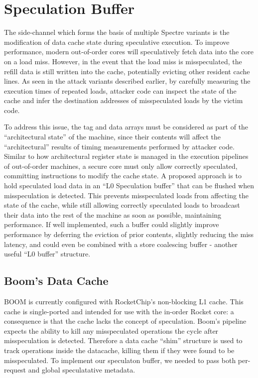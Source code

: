 \section{Speculation Buffer} \label{Speculation Buffer}

The side-channel which forms the basis of multiple Spectre variants is the modification of data cache state during speculative execution.
To improve performance, modern out-of-order cores will speculatively fetch data into the core on a load miss.
However, in the event that the load miss is misspeculated, the refill data is still written into the cache, potentially evicting other resident cache lines.
As seen in the attack variants described earlier, by carefully measuring the execution times of repeated loads, attacker code can inspect the state of the cache and infer the destination addresses of misspeculated loads by the victim code.

To address this issue, the tag and data arrays must be considered as part of the ``architectural state'' of the machine, since their contents will affect the ``architectural'' results of timing measurements performed by attacker code.
Similar to how architectural register state is managed in the execution pipelines of out-of-order machines, a secure core must only allow correctly speculated, committing instructions to modify the cache state.
A proposed approach is to hold speculated load data in an ``L0 Speculation buffer'' that can be flushed when misspeculation is detected.
This prevents misspeculated loads from affecting the state of the cache, while still allowing correctly speculated loads to broadcast their data into the rest of the machine as soon as possible, maintaining performance. If well implemented, such a buffer could slightly improve performance by deferring the eviction of prior contents, slightly reducing the miss latency, and could even be combined with a store coalescing buffer - another useful ``L0 buffer'' structure.

\subsection{Boom's Data Cache}
BOOM is currently configured with RocketChip's non-blocking L1 cache. This cache is single-ported and intended for use with the in-order Rocket core: a consequence is that the cache lacks the concept of speculation. Boom's pipeline expects the ability to kill any misspeculated operations the cycle after misspeculation is detected. Therefore a data cache ``shim'' structure is used to track operations inside the datacache, killing them if they were found to be misspeculated. To implement our speculaton buffer, we needed to pass both per-request and global speculatative metadata.

